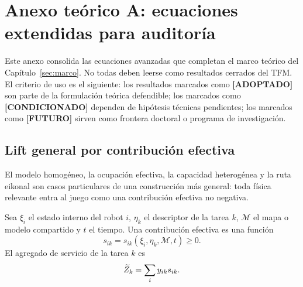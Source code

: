 \section{Anexo teórico A: ecuaciones extendidas para auditoría}
\label{sec:anexo-teorico-extendido}

Este anexo consolida las ecuaciones avanzadas que completan el marco teórico del
Capítulo~\ref{sec:marco}. No todas deben leerse como resultados cerrados del TFM. El
criterio de uso es el siguiente: los resultados marcados como \textbf{[ADOPTADO]} son
parte de la formulación teórica defendible; los marcados como \textbf{[CONDICIONADO]}
dependen de hipótesis técnicas pendientes; los marcados como \textbf{[FUTURO]} sirven
como frontera doctoral o programa de investigación.

\subsection{Lift general por contribución efectiva}
\label{subsec:lift-contribucion}

El modelo homogéneo, la ocupación efectiva, la capacidad heterogénea y la ruta eikonal
son casos particulares de una construcción más general: toda física relevante entra al
juego como una contribución efectiva no negativa.

\begin{definicion}
Sea $\xi_i$ el estado interno del robot $i$, $\eta_k$ el descriptor de la tarea $k$,
$\mathcal{M}$ el mapa o modelo compartido y $t$ el tiempo. Una contribución efectiva es
una función
\begin{equation}
  s_{ik}=s_{ik}(\xi_i,\eta_k,\mathcal{M},t)\ge0.
  \label{eq:anexo_s_general}
\end{equation}
El agregado de servicio de la tarea $k$ es
\begin{equation}
  \widetilde{Z}_k=\sum_i y_{ik}s_{ik}.
  \label{eq:anexo_Z_general}
\end{equation}
\end{definicion}

